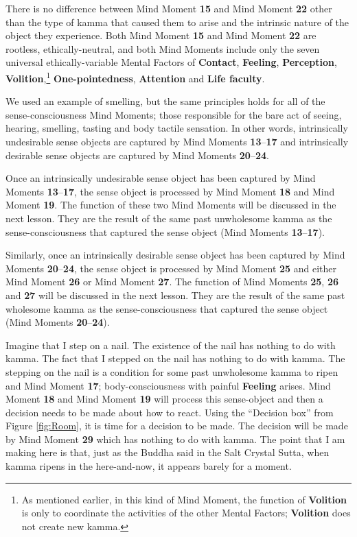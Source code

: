 There is no difference between Mind Moment \textbf{15} and Mind Moment \textbf{22} other than the type of kamma that caused them to arise and the intrinsic nature of the object they experience. Both Mind Moment \textbf{15} and Mind Moment \textbf{22} are rootless, ethically-neutral, and both Mind Moments include only the seven universal ethically-variable Mental Factors of \textbf{Contact}, \textbf{Feeling}, \textbf{Perception}, \textbf{Volition},\footnote{As mentioned earlier, in this kind of Mind Moment, the function of \textbf{Volition} is only to coordinate the activities of the other Mental Factors; \textbf{Volition} does not create new kamma.} \textbf{One-pointedness}, \textbf{Attention} and \textbf{Life faculty}.

We used an example of smelling, but the same principles holds for all of the sense-consciousness Mind Moments; those responsible for the bare act of seeing, hearing, smelling, tasting and body tactile sensation. In other words, intrinsically undesirable sense objects are captured by Mind Moments \textbf{13}--\textbf{17} and intrinsically desirable sense objects are captured by Mind Moments \textbf{20}--\textbf{24}.

Once an intrinsically undesirable sense object has been captured by Mind Moments \textbf{13}--\textbf{17}, the sense object is processed by Mind Moment \textbf{18} and Mind Moment \textbf{19}. The function of these two Mind Moments will be discussed in the next lesson. They are the result of the same past unwholesome kamma as the sense-consciousness that captured the sense object (Mind Moments \textbf{13}--\textbf{17}).

Similarly, once an intrinsically desirable sense object has been captured by Mind Moments \textbf{20}--\textbf{24}, the sense object is processed by Mind Moment \textbf{25} and either Mind Moment \textbf{26} or Mind Moment \textbf{27}. The function of Mind Moments \textbf{25}, \textbf{26} and \textbf{27} will be discussed in the next lesson. They are the result of the same past wholesome kamma as the sense-consciousness that captured the sense object (Mind Moments \textbf{20}--\textbf{24}).

Imagine that I step on a nail. The existence of the nail has nothing to do with kamma. The fact that I stepped on the nail has nothing to do with kamma. The stepping on the nail is a condition for some past unwholesome kamma to ripen and Mind Moment \textbf{17}; body-consciousness with painful \textbf{Feeling} arises. Mind Moment \textbf{18} and Mind Moment \textbf{19} will process this sense-object and then a decision needs to be made about how to react. Using the “Decision box” from Figure \ref{fig:Room}, it is time for a decision to be made. The decision will be made by Mind Moment \textbf{29} which has nothing to do with kamma. The point that I am making here is that, just as the Buddha said in the Salt Crystal Sutta, when kamma ripens in the here-and-now, it appears barely for a moment.

